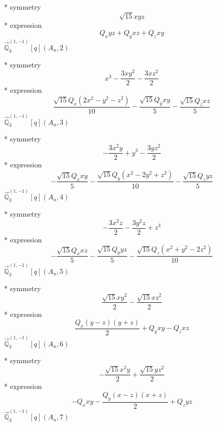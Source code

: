 \documentclass[fleqn,8pt]{jsarticle}
\begin{document}
\noindent\quad ** symmetry
\begin{dmath*}
\sqrt{15} x y z
\end{dmath*}
\noindent\quad ** expression
\begin{dmath*}
Q_{x} y z + Q_{y} x z + Q_{z} x y
\end{dmath*}
\noindent\quad $\vec{\mathbb{Q}}_{3}^{(1,-1)}[q](A_{u},2)$

\noindent\quad ** symmetry
\begin{dmath*}
x^{3} - \frac{3 x y^{2}}{2} - \frac{3 x z^{2}}{2}
\end{dmath*}
\noindent\quad ** expression
\begin{dmath*}
\frac{\sqrt{15} Q_{x} \left(2 x^{2} - y^{2} - z^{2}\right)}{10} - \frac{\sqrt{15} Q_{y} x y}{5} - \frac{\sqrt{15} Q_{z} x z}{5}
\end{dmath*}
\noindent\quad $\vec{\mathbb{Q}}_{3}^{(1,-1)}[q](A_{u},3)$

\noindent\quad ** symmetry
\begin{dmath*}
- \frac{3 x^{2} y}{2} + y^{3} - \frac{3 y z^{2}}{2}
\end{dmath*}
\noindent\quad ** expression
\begin{dmath*}
- \frac{\sqrt{15} Q_{x} x y}{5} - \frac{\sqrt{15} Q_{y} \left(x^{2} - 2 y^{2} + z^{2}\right)}{10} - \frac{\sqrt{15} Q_{z} y z}{5}
\end{dmath*}
\noindent\quad $\vec{\mathbb{Q}}_{3}^{(1,-1)}[q](A_{u},4)$

\noindent\quad ** symmetry
\begin{dmath*}
- \frac{3 x^{2} z}{2} - \frac{3 y^{2} z}{2} + z^{3}
\end{dmath*}
\noindent\quad ** expression
\begin{dmath*}
- \frac{\sqrt{15} Q_{x} x z}{5} - \frac{\sqrt{15} Q_{y} y z}{5} - \frac{\sqrt{15} Q_{z} \left(x^{2} + y^{2} - 2 z^{2}\right)}{10}
\end{dmath*}
\noindent\quad $\vec{\mathbb{Q}}_{3}^{(1,-1)}[q](A_{u},5)$

\noindent\quad ** symmetry
\begin{dmath*}
\frac{\sqrt{15} x y^{2}}{2} - \frac{\sqrt{15} x z^{2}}{2}
\end{dmath*}
\noindent\quad ** expression
\begin{dmath*}
\frac{Q_{x} \left(y - z\right) \left(y + z\right)}{2} + Q_{y} x y - Q_{z} x z
\end{dmath*}
\noindent\quad $\vec{\mathbb{Q}}_{3}^{(1,-1)}[q](A_{u},6)$

\noindent\quad ** symmetry
\begin{dmath*}
- \frac{\sqrt{15} x^{2} y}{2} + \frac{\sqrt{15} y z^{2}}{2}
\end{dmath*}
\noindent\quad ** expression
\begin{dmath*}
- Q_{x} x y - \frac{Q_{y} \left(x - z\right) \left(x + z\right)}{2} + Q_{z} y z
\end{dmath*}
\noindent\quad $\vec{\mathbb{Q}}_{3}^{(1,-1)}[q](A_{u},7)$
\end{document}
